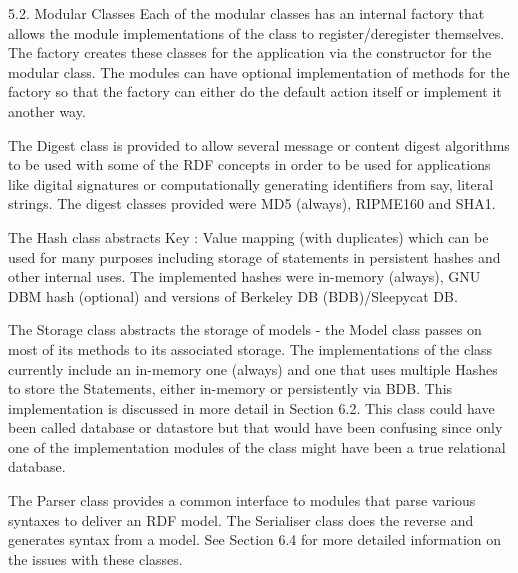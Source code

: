 \documentclass[11pt]{article}
\begin{document}
    5.2. Modular Classes
    Each of the modular classes has an internal factory that allows the module implementations of the class to register/deregister themselves. The factory creates these classes for the application via the constructor for the modular class. The modules can have optional implementation of methods for the factory so that the factory can either do the default action itself or implement it another way.

    The Digest class is provided to allow several message or content digest algorithms to be used with some of the RDF concepts in order to be used for applications like digital signatures or computationally generating identifiers from say, literal strings. The digest classes provided were MD5 (always), RIPME160 and SHA1.

    The Hash class abstracts Key : Value mapping (with duplicates) which can be used for many purposes including storage of statements in persistent hashes and other internal uses. The implemented hashes were in-memory (always), GNU DBM hash (optional) and versions of Berkeley DB (BDB)/Sleepycat DB.

    The Storage class abstracts the storage of models - the Model class passes on most of its methods to its associated storage. The implementations of the class currently include an in-memory one (always) and one that uses multiple Hashes to store the Statements, either in-memory or persistently via BDB. This implementation is discussed in more detail in Section 6.2. This class could have been called database or datastore but that would have been confusing since only one of the implementation modules of the class might have been a true relational database.

    The Parser class provides a common interface to modules that parse various syntaxes to deliver an RDF model. The Serialiser class does the reverse and generates syntax from a model. See Section 6.4 for more detailed information on the issues with these classes.
\end{document}
